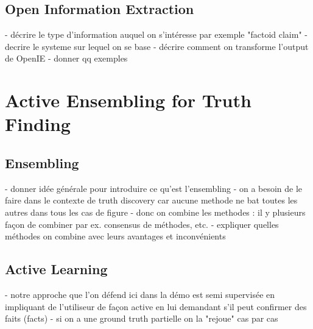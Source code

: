 \subsection{Open Information Extraction}
-  décrire le type d'information auquel on s'intéresse par exemple "factoid claim"
- decrire le systeme sur lequel on se base
- décrire comment on transforme l'output de OpenIE
- donner qq exemples

\section{Active Ensembling for Truth Finding}

\subsection{Ensembling }
- donner idée générale pour introduire  ce qu'est l'ensembling
- on a besoin de le faire dans le contexte de truth discovery car aucune methode ne bat toutes les autres dans tous les cas de figure
- donc on combine les methodes : il y plusieurs façon de combiner par ex. consensus de méthodes, etc.
- expliquer quelles méthodes on combine avec leurs avantages et inconvénients

\subsection{Active Learning }
- notre approche que l'on défend ici dans la démo est  semi supervisée en impliquant de l'utiliseur de façon active
en lui demandant s'il peut confirmer des faits (facts)
- si on a une ground truth partielle on la "rejoue" cas par cas




